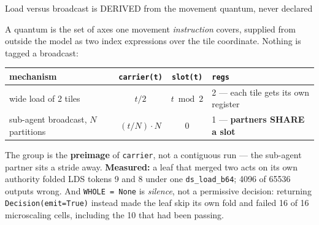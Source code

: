 \documentclass[aspectratio=169,9pt]{beamer}
\newcommand{\tsub}[1]{{\footnotesize\color{gray}#1}}
\newcommand{\key}[1]{\textcolor{acc}{\textbf{#1}}}
\newcommand{\bad}[1]{\textcolor{warn}{\textbf{#1}}}
\begin{document}
\begin{frame}{Load versus broadcast is DERIVED from the movement quantum, never declared}
\centering
{}

\vspace{3pt}
\scriptsize
A quantum is the set of axes one movement \emph{instruction} covers, supplied from outside the model
as two index expressions over the tile coordinate. Nothing is tagged a broadcast:

\vspace{2pt}
\begin{tabular}{@{}l c c l@{}}
\toprule
mechanism & \texttt{carrier(t)} & \texttt{slot(t)} & \texttt{regs} \\
\midrule
wide load of 2 tiles & $t/2$ & $t \bmod 2$ & 2 --- each tile gets its own register \\
sub-agent broadcast, $N$ partitions & $(t/N)\cdot N$ & $0$ & 1 --- \key{partners SHARE a slot} \\
\bottomrule
\end{tabular}

\vspace{3pt}
The group is the \key{preimage} of \texttt{carrier}, not a contiguous run --- the sub-agent partner
sits a stride away. \bad{Measured:} a leaf that merged two acts on its own authority folded LDS
tokens 9 and 8 under one \texttt{ds\_load\_b64}; 4096 of 65536 outputs wrong. And
\texttt{WHOLE = None} is \emph{silence}, not a permissive decision: returning
\texttt{Decision(emit=True)} instead made the leaf skip its own fold and failed 16 of 16
microscaling cells, including the 10 that had been passing.
\end{frame}
\end{document}

